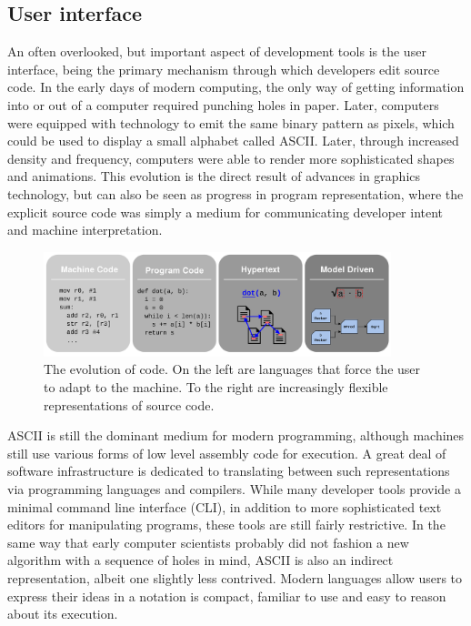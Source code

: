 \documentclass[12pt,initial,twoside,maitrise]{dms}
\numberwithin{equation}{section}
\numberwithin{table}{chapter}
\numberwithin{figure}{chapter}
\begin{document}
\subsection{User interface}

An often overlooked, but important aspect of development tools is the user interface, being the primary mechanism through which developers edit source code. In the early days of modern computing, the only way of getting information into or out of a computer required punching holes in paper. Later, computers were equipped with technology to emit the same binary pattern as pixels, which could be used to display a small alphabet called ASCII. Later, through increased density and frequency, computers were able to render more sophisticated shapes and animations. This evolution is the direct result of advances in graphics technology, but can also be seen as progress in program representation, where the explicit source code was simply a medium for communicating developer intent and machine interpretation.

\begin{figure}
    \centering
    \includegraphics[width=0.90\textwidth]{progress_in_program.png}
    \caption{The evolution of code. On the left are languages that force the user to adapt to the machine. To the right are increasingly flexible representations of source code.}
    \label{fig:evolution_of_programming}
\end{figure}

ASCII is still the dominant medium for modern programming, although machines still use various forms of low level assembly code for execution. A great deal of software infrastructure is dedicated to translating between such representations via programming languages and compilers. While many developer tools provide a minimal command line interface (CLI), in addition to more sophisticated text editors for manipulating programs, these tools are still fairly restrictive. In the same way that early computer scientists probably did not fashion a new algorithm with a sequence of holes in mind, ASCII is also an indirect representation, albeit one slightly less contrived. Modern languages allow users to express their ideas in a notation is compact, familiar to use and easy to reason about its execution.
\end{document}
